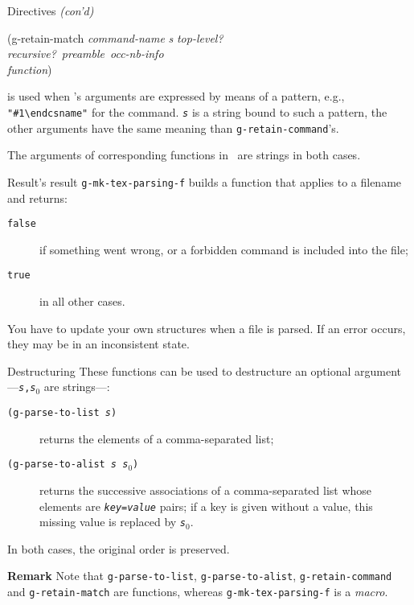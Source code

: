 \documentclass[pdf]{beamer}
\newcommand{\Dash}{---}
\begin{document}
\begin{frame}{Directives \emph{(con'd)}}
\begin{ttfamily}
\begin{tabbing}
(g-retain-match \= \textsl{command-name} \textsl{s} \textsl{top-level?}\ \\
 \> \textsl{recursive?}\ \textsl{preamble}\ \textsl{occ-nb-info} \\
 \> \textsl{function})
\end{tabbing}
\end{ttfamily}
is used when 's arguments are expressed by means
of a pattern, e.g., \texttt{"\#1\textbackslash endcsname"} for the
 command. \texttt{\textsl{s}} is a string bound to such a
pattern, the other arguments have the same meaning than
\texttt{g-retain-command}'s.\pause

The arguments of corresponding functions in \pgScheme\ are strings in both
cases.
\end{frame}

\begin{frame}{Result's result}
\texttt{g-mk-tex-parsing-f} builds a function that applies to a filename and
returns:
\begin{description}
 \item[\textnormal{\texttt{false}}] if something went wrong, or a forbidden
command is included into the file;
 \item[\textnormal{\texttt{true}}] in all other cases. 
\end{description}\pause

You have to update your own structures when a file is parsed. If an error
occurs, they may be in an inconsistent state.
\end{frame}

\begin{frame}{Destructuring}
These functions can be used to destructure an optional
argument\Dash\texttt{\textsl{s},\textsl{s}$_{0}$} are strings\Dash:\pause
\begin{description}
 \item[\textnormal{\texttt{(g-parse-to-list \textsl{s})}}] returns the elements
of a comma-separated list;
 \item[\textnormal{\texttt{(g-parse-to-alist \textsl{s} \textsl{s}$_{0}$)}}]
returns the successive associations of a comma-separated list whose elements 
are \texttt{\textsl{key=value}} pairs; if a key is given without a value, this
missing value is replaced by \texttt{\textsl{s}$_{0}$}.
\end{description}
In both cases, the original order is preserved.\pause

\textbf{Remark} \quad Note that \texttt{g-parse-to-list},
\texttt{g-parse-to-alist}, \texttt{g-retain-command} and
\texttt{g-retain-match} are functions, whereas \texttt{g-mk-tex-parsing-f} is a
\emph{macro}.
\end{frame}
\end{document}
